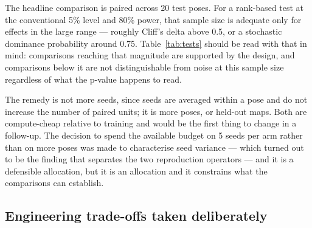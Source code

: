 \documentclass[conference]{IEEEtran}
\begin{document}
The headline comparison is paired across 20 test poses. For a rank-based test at the conventional 5\% level and 80\% power, that sample size is adequate only for effects in the large range — roughly Cliff's delta above 0.5, or a stochastic dominance probability around 0.75. Table~\ref{tab:tests} should be read with that in mind: comparisons reaching that magnitude are supported by the design, and comparisons below it are not distinguishable from noise at this sample size regardless of what the p-value happens to read.

The remedy is not more seeds, since seeds are averaged within a pose and do not increase the number of paired units; it is more poses, or held-out maps. Both are compute-cheap relative to training and would be the first thing to change in a follow-up. The decision to spend the available budget on 5 seeds per arm rather than on more poses was made to characterise seed variance — which turned out to be the finding that separates the two reproduction operators — and it is a defensible allocation, but it is an allocation and it constrains what the comparisons can establish.

\subsection{Engineering trade-offs taken deliberately}
\end{document}
